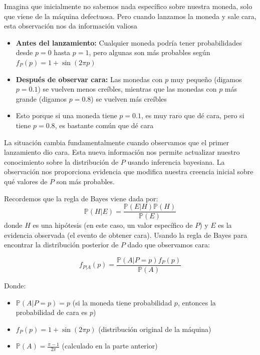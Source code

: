 \documentclass[
  11pt,
  letterpaper,
   addpoints,
  answers
  ]{exam}
\begin{document}
\begin{questions}
\begin{solution}
Imagina que inicialmente no sabemos nada específico sobre nuestra moneda, solo que viene de la máquina defectuosa. Pero cuando lanzamos la moneda y sale cara, esta observación nos da información valiosa

\begin{itemize}
\item \textbf{Antes del lanzamiento:} Cualquier moneda podría tener probabilidades desde $p = 0$ hasta $p = 1$, pero algunas son más probables según $f_P(p) = 1 + \sin(2\pi p)$
\item \textbf{Después de observar cara:} Las monedas con $p$ muy pequeño (digamos $p = 0.1$) se vuelven menos creíbles, mientras que las monedas con $p$ más grande (digamos $p = 0.8$) se vuelven más creíbles
\item Esto porque si una moneda tiene $p = 0.1$, es muy raro que dé cara, pero si tiene $p = 0.8$, es bastante común que dé cara
\end{itemize}

La situación cambia fundamentalmente cuando observamos que el primer lanzamiento dio cara. Esta nueva información nos permite actualizar nuestro conocimiento sobre la distribución de $P$ usando inferencia bayesiana. La observación nos proporciona evidencia que modifica nuestra creencia inicial sobre qué valores de $P$ son más probables.

Recordemos que la regla de Bayes viene dada por:
\begin{equation}
\mathbb{P}(H | E) = \frac{\mathbb{P}(E | H) \mathbb{P}(H)}{\mathbb{P}(E)}
\end{equation}
donde $H$ es una hipótesis (en este caso, un valor específico de $P$) y $E$ es la evidencia observada (el evento de obtener cara). Usando la regla de Bayes para encontrar la distribución posterior de $P$ dado que observamos cara:

\begin{equation}
f_{P|A}(p) = \frac{\mathbb{P}(A | P = p)f_P(p)}{\mathbb{P}(A)}
\end{equation}

Donde:
\begin{itemize}
\item $\mathbb{P}(A | P = p) = p$ (si la moneda tiene probabilidad $p$, entonces la probabilidad de cara es $p$)
\item $f_P(p) = 1 + \sin(2\pi p)$ (distribución original de la máquina)
\item $\mathbb{P}(A) = \frac{\pi - 1}{2\pi}$ (calculado en la parte anterior)
\end{itemize}


\end{solution}
\end{questions}
\end{document}
